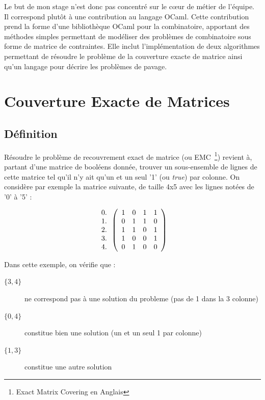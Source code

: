 \documentclass[a4paper]{article}
\begin{document}
Le but de mon stage n'est donc pas concentré sur le c\oe ur de métier de 
l'équipe. Il correspond plutôt à une contribution au langage OCaml. 
Cette contribution
prend la forme d'une bibliothèque OCaml pour la combinatoire, apportant
des méthodes simples permettant de modéliser des problèmes de combinatoire
sous forme de matrice de contraintes. Elle inclut l'implémentation de 
deux algorithmes permettant de résoudre le problème de la couverture exacte de
matrice ainsi qu'un langage pour décrire les problèmes de pavage.


\section{Couverture Exacte de Matrices}

\subsection{Définition}

Résoudre le problème de recouvrement exact de matrice 
(ou EMC~\footnote{Exact Matrix Covering en Anglais}) revient à,
partant d'une matrice de booléens donnée, trouver un sous-ensemble de 
lignes de cette matrice tel qu'il n'y ait qu'un et un seul '1' (ou \emph{true}) 
par colonne.
On considère par exemple la matrice suivante, de taille 4x5 avec les lignes
notées de '0' à '5' : 

\[
  \begin{array}{ c }
   0. \\
   1. \\
   2. \\
   3. \\
   4. \\
  \end{array}
\left(
  \begin{array}{ c c c c c }
   1 & 0 & 1 & 1 \\
   0 & 1 & 1 & 0 \\
   1 & 1 & 0 & 1 \\
   1 & 0 & 0 & 1 \\
   0 & 1 & 0 & 0
  \end{array} \right)
\]

Dans cette exemple, on vérifie que :

\begin{description}
\item[$ \{3, 4\} $] ne correspond pas à une solution du probleme (pas de 1 dans la 3 colonne)
\item[$ \{0, 4\} $] constitue bien une solution (un et un seul 1 par colonne)
\item[$ \{1, 3\} $] constitue une autre solution
\end{description}
\end{document}
